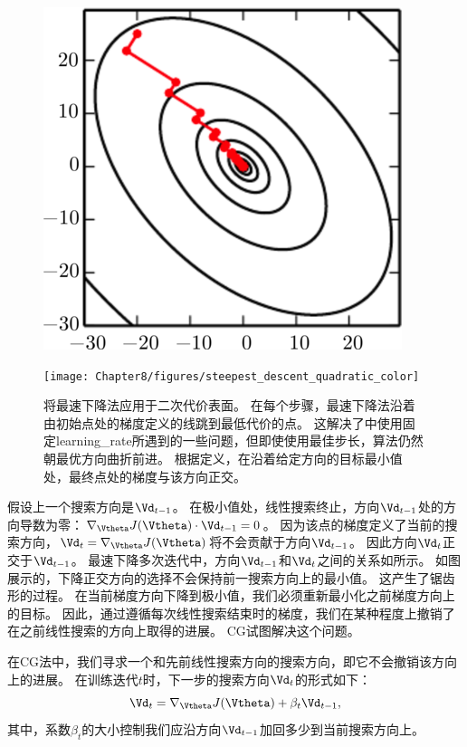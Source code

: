 \begin{figure}[!htb]
\ifOpenSource
\centerline{\includegraphics[scale=0.5]{images/68.png}}
\else
\centerline{\texttt{[image: Chapter8/figures/steepest\_descent\_quadratic\_color]}}
\fi
\caption{将最速下降法应用于二次代价表面。
在每个步骤，最速下降法沿着由初始点处的梯度定义的线跳到最低代价的点。
这解决了中使用固定\gls{learning_rate}所遇到的一些问题，但即使使用最佳步长，算法仍然朝最优方向曲折前进。
根据定义，在沿着给定方向的目标最小值处，最终点处的梯度与该方向正交。
}
\label{fig:chap8_steepest_descent_quadratic}
\end{figure}



假设上一个搜索方向是$\Vd_{t-1}$。   
在极小值处，线性搜索终止，方向$\Vd_{t-1}$处的方向导数为零：$\nabla_{\Vtheta} J(\Vtheta) \cdot \Vd_{t-1} = 0$。
因为该点的梯度定义了当前的搜索方向，$\Vd_t = \nabla_{\Vtheta} J(\Vtheta)$将不会贡献于方向$\Vd_{t-1}$。
因此方向$\Vd_t$正交于$\Vd_{t-1}$。
最速下降多次迭代中，方向$\Vd_{t-1}$和$\Vd_t$之间的关系如所示。
如图展示的，下降正交方向的选择不会保持前一搜索方向上的最小值。
这产生了锯齿形的过程。
在当前梯度方向下降到极小值，我们必须重新最小化之前梯度方向上的目标。
因此，通过遵循每次线性搜索结束时的梯度，我们在某种程度上撤销了在之前线性搜索的方向上取得的进展。
\gls{CG}试图解决这个问题。

在\gls{CG}法中，我们寻求一个和先前线性搜索方向的搜索方向，即它不会撤销该方向上的进展。
在训练迭代$t$时，下一步的搜索方向$\Vd_t$的形式如下：
\begin{equation}
    \Vd_t = \nabla_{\Vtheta} J(\Vtheta) + \beta_t \Vd_{t-1},
\end{equation}
其中，系数$\beta_t$的大小控制我们应沿方向$\Vd_{t-1}$加回多少到当前搜索方向上。

